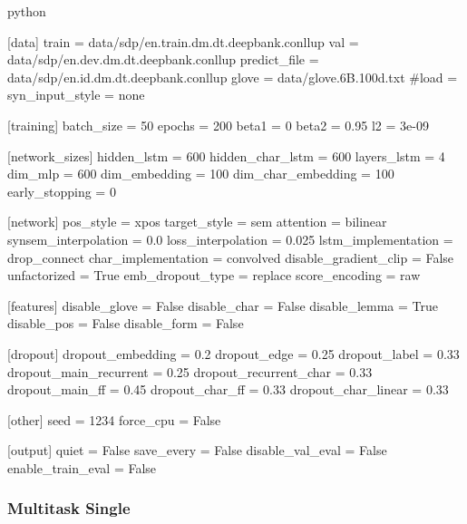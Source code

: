 \documentclass[11pt]{scrartcl}
\begin{document}
\begin{mintedbox}{python}

[data]
train                  = data/sdp/en.train.dm.dt.deepbank.conllup
val                    = data/sdp/en.dev.dm.dt.deepbank.conllup
predict_file           = data/sdp/en.id.dm.dt.deepbank.conllup
glove                  = data/glove.6B.100d.txt
#load                   = 
syn_input_style        = none

[training]
batch_size             = 50
epochs                 = 200
beta1                  = 0
beta2                  = 0.95
l2                     = 3e-09

[network_sizes]
hidden_lstm            = 600
hidden_char_lstm       = 600
layers_lstm            = 4
dim_mlp                = 600
dim_embedding          = 100
dim_char_embedding     = 100
early_stopping         = 0

[network]
pos_style              = xpos
target_style           = sem 
attention              = bilinear
synsem_interpolation   = 0.0
loss_interpolation     = 0.025
lstm_implementation    = drop_connect
char_implementation    = convolved
disable_gradient_clip  = False
unfactorized           = True
emb_dropout_type       = replace
score_encoding         = raw

[features]
disable_glove          = False
disable_char           = False
disable_lemma          = True
disable_pos            = False
disable_form           = False

[dropout]
dropout_embedding      = 0.2
dropout_edge           = 0.25
dropout_label          = 0.33
dropout_main_recurrent = 0.25
dropout_recurrent_char = 0.33
dropout_main_ff        = 0.45
dropout_char_ff        = 0.33
dropout_char_linear    = 0.33

[other]
seed                   = 1234
force_cpu              = False

[output]
quiet                  = False
save_every             = False
disable_val_eval       = False
enable_train_eval      = False


\end{mintedbox}

\subsubsection{Multitask Single}
\end{document}
